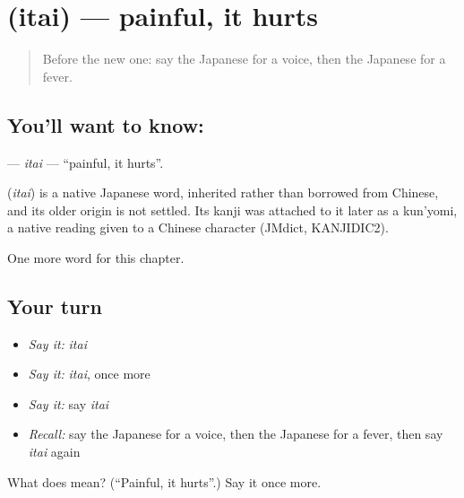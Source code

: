 \section[\texorpdfstring{\ja{いたい} (itai)}{いたい (itai)}]{ (itai) — painful, it hurts}

\label{lesson:JA-C22-itai}



\begin{quote}
Before the new one: say the Japanese for a voice, then the Japanese for a fever.
\end{quote}

\subsection*{You'll want to know: }
\textbf{} — \emph{itai} — \textquotedblleft{}painful, it hurts\textquotedblright{}.

\begin{cousinweb}
\textbf{} (\emph{itai}) is a native Japanese word, inherited rather than borrowed from Chinese, and its older origin is not settled. Its kanji was attached to it later as a kun'yomi, a native reading given to a Chinese character (JMdict, KANJIDIC2).
\end{cousinweb}

\begin{grammarlens}[title={What you've built}]
One more word for this chapter.
\end{grammarlens}

\subsection*{Your turn}
\begin{itemize}
\raggedright
  \item \emph{Say it:} \emph{itai}
  \item \emph{Say it:} \emph{itai}, once more
  \item \emph{Say it:} say \emph{itai}
  \item \emph{Recall:} say the Japanese for a voice, then the Japanese for a fever, then say \emph{itai} again
\end{itemize}

\begin{tcolorbox}[breakable,colback=teal!4,colframe=teal!35!black,title={Before you move on}]
What does  mean? (\textquotedblleft{}Painful, it hurts\textquotedblright{}.) Say it once more.
\end{tcolorbox}
